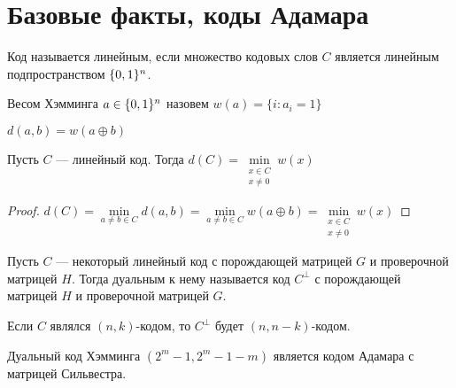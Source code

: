 
\section{Базовые факты, коды Адамара}
\begin{definition}
Код называется линейным, если множество кодовых слов $C$ является
линейным подпространством $\{0,1\}^n$.
\end{definition}

\begin{definition}
Весом Хэмминга $a \in \{0,1\}^n$ назовем $w(a) = \{i \colon a_i = 1\}$
\end{definition}

\begin{remark}
$d(a,b) = w(a \oplus b)$
\end{remark}

\begin{lemma}
Пусть $C$ --- линейный код. Тогда $d(C) = \min\limits_{\substack{x \in C \\ x \neq 0}} w(x)$
\end{lemma}
\begin{proof}
$d(C) = \min\limits_{a\neq b \in C} d(a,b) =\min\limits_{a\neq b \in C} w(a \oplus b) =
 \min\limits_{\substack{x \in C \\ x \neq 0}} w(x)$
\end{proof}

\begin{definition}
Пусть $C$ --- некоторый линейный код с порождающей матрицей $G$ и проверочной
матрицей $H$. Тогда дуальным к нему называется код $C^{\bot}$ с порождающей
матрицей $H$ и проверочной матрицей $G$.

Если $C$ являлся $(n,k)$-кодом, то $C^{\bot}$ будет $(n,n-k)$-кодом.
\end{definition}


\begin{theorem}
Дуальный код Хэмминга $(2^m-1, 2^m-1-m)$ является кодом Адамара с матрицей
Сильвестра.
\end{theorem}

